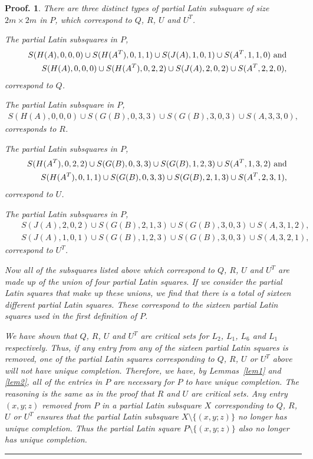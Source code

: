 \documentclass[12pt]{report}
\newtheorem{preproof}{{\bf Proof.}}
\newenvironment{proof}[1]{\begin{preproof}{\rm
               #1}\hfill{\rule[-0.5mm]{2mm}{2mm}}}{\end{preproof}}
\begin{document}
\begin{proof}
{There are three distinct types of partial Latin subsquare of size $2m \times 2m$
in $P$, which correspond to $Q$, $R$, $U$ and $U^T$.

The partial Latin subsquares in $P$, 
\begin{eqnarray*}
&& S(H(A),0,0,0) \cup S(H(A^T),0,1,1) \cup S(J(A),1,0,1) \cup S(A^T,1,1,0) {\rm ~and} \\
&& S(H(A),0,0,0) \cup S(H(A^T),0,2,2) \cup S(J(A),2,0,2) \cup S(A^T,2,2,0),
\end{eqnarray*}
correspond to $Q$.

The partial Latin subsquare in $P$, 
\begin{eqnarray*}
S(H(A),0,0,0) \cup S(G(B),0,3,3) \cup S(G(B),3,0,3) \cup S(A,3,3,0),
\end{eqnarray*}
corresponds to $R$.

The partial Latin subsquares in $P$, 
\begin{eqnarray*}
&& S(H(A^T),0,2,2) \cup S(G(B),0,3,3) \cup S(G(B),1,2,3) \cup S(A^T,1,3,2) {\rm ~and} \\
&& S(H(A^T),0,1,1) \cup S(G(B),0,3,3) \cup S(G(B),2,1,3) \cup S(A^T,2,3,1),
\end{eqnarray*}
correspond to $U$.  

The partial Latin subsquares in $P$,
\begin{eqnarray*}
&& S(J(A),2,0,2) \cup S(G(B),2,1,3) \cup S(G(B),3,0,3) \cup S(A,3,1,2), \\
&& S(J(A),1,0,1) \cup S(G(B),1,2,3) \cup S(G(B),3,0,3) \cup S(A,3,2,1),
\end{eqnarray*}
correspond to $U^T$.

Now all of the subsquares listed above which correspond to $Q$, $R$,
$U$ and $U^T$ are made up of the union of four partial Latin squares.
If we consider the partial Latin squares that make up these unions,
we find that there is a total of sixteen different partial Latin squares.
These correspond to the sixteen partial Latin squares used in the
first definition of $P$.

We have shown that $Q$, $R$, $U$ and $U^T$ are critical sets for $L_2$,
$L_1$, $L_6$ and $L_1$ respectively.  Thus, if any entry from any of
the sixteen partial Latin squares is removed, one of the partial
Latin squares corresponding to $Q$, $R$, $U$ or $U^T$ above will
not have unique completion.  Therefore,
we have, by Lemmas~\ref{lem1} and \ref{lem2}, all of the entries
in $P$ are necessary for $P$ to have unique completion.  The reasoning
is the same as in the proof that $R$ and $U$ are critical sets. 
Any entry $(x,y;z)$ removed from $P$ in a partial Latin subsquare $X$ corresponding to $Q$, $R$,
$U$ or $U^T$ ensures that the partial Latin subsquare $X \setminus \{(x,y;z)\}$ no longer has unique completion.  Thus the
partial Latin square $P \setminus \{(x,y;z)\}$ also no longer has unique completion.

}
\end{proof}
\end{document}

